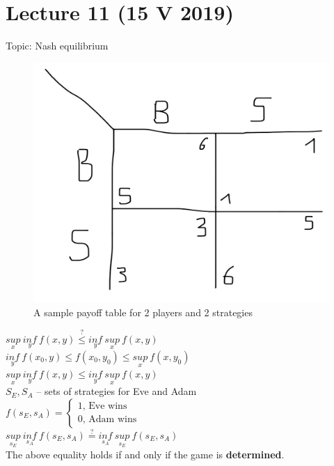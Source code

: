 \section{Lecture 11 (15 V 2019)}
Topic: Nash equilibrium

\begin{figure}[H]
    \centering
    \caption{A sample payoff table for 2 players and 2 strategies}
    \includegraphics[scale=0.1]{content/graphics/game21.png}
\end{figure}

\noindent
$\underset{x}{sup}\ \underset{y}{inf}\ f(x, y) \stackrel{?}{\leq} \underset{y}{inf}\ \underset{x}{sup}\ f(x, y)$\\

\noindent
$\underset{y}{inf}\ f(x_0, y) \leq f(x_0, y_0) \leq \underset{x}{sup}\ f(x, y_0)$\\

\noindent
$\underset{x}{sup}\ \underset{y}{inf}\ f(x, y) \leq \underset{y}{inf}\ \underset{x}{sup}\ f(x, y)$\\

\noindent
$S_E, S_A$ -- sets of strategies for Eve and Adam\\
$f(s_E, s_A) = \begin{cases}
    1\text{, Eve wins}\\
    0\text{, Adam wins}
\end{cases}$\\

\noindent
$\underset{s_E}{sup}\ \underset{s_A}{inf}\ f(s_E, s_A) \stackrel{?}{=} \underset{s_A}{inf}\ \underset{s_E}{sup}\ f(s_E, s_A)$\\
The above equality holds if and only if the game is \textbf{determined}.\\


